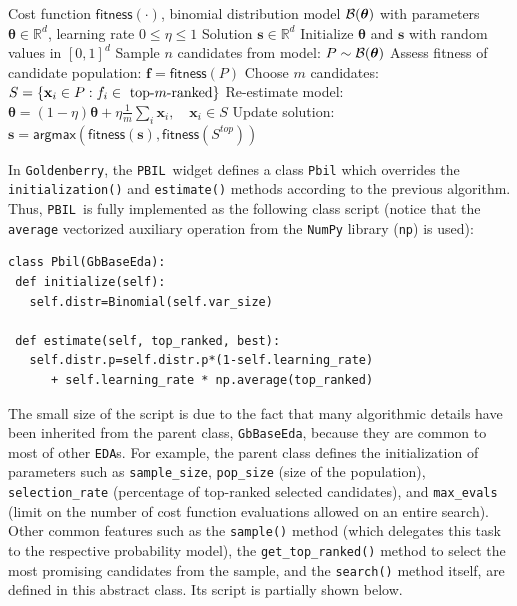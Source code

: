 \documentclass{sig-alternate}
\newcommand{\GB}{\texttt{Goldenberry}}
\newcommand{\PBIL}{\texttt{PBIL}}
\newcommand{\EDA}{\texttt{EDA}}
\newcommand{\bs}{{\mathbf s}}
\newcommand{\bx}{{\mathbf x}}
\renewcommand{\bf}{{\mathbf f}}
\newcommand{\cB}{{\cal B}}
\newcommand{\Rdom}{\mbox{$\mathbb{R}$}}
\begin{document}
\begin{algorithm}[H]
	\caption{\PBIL} 
	\small
	\begin{algorithmic}
	\REQUIRE Cost function $\mathsf{fitness}(\cdot)$, binomial distribution model $\cB(\boldsymbol \theta)$ with parameters $\boldsymbol \theta\in \Rdom^d$, learning rate $0 \le \eta \le 1$
	\ENSURE Solution $\bs \in \Rdom^d$
		\STATE Initialize $\boldsymbol \theta$ and $\bs$ with random values in $[0,1]^d$
		\WHILE{}
			\STATE Sample $n$ candidates from model: $P \sim \cB(\boldsymbol \theta)$ 
			\STATE Assess fitness of candidate population: $\bf = \mathsf{fitness}(P)$
			\STATE Choose $m$ candidates: $S = \{\bx_i \in P : f_i \in \textnormal{ top-$m$-ranked}\}$
			\STATE Re-estimate model: $\boldsymbol \theta = (1-\eta)\boldsymbol \theta + \eta\tfrac{1}{m}\sum_i{\bx_i}, \quad\bx_i \in S$
			\STATE Update solution: $\bs\!=\!\mathsf{argmax}(\mathsf{fitness}(\bs),\mathsf{fitness}(S^{top}))$
		\ENDWHILE
	\end{algorithmic}  
	\label{alg:PBIL}
\end{algorithm}

In \GB, the \PBIL~widget defines a class \texttt{Pbil} which overrides the \texttt{initialization()} and \texttt{estimate()} methods according to the previous algorithm. Thus, \PBIL~is fully implemented as the following class script (notice that the \texttt{average} vectorized auxiliary operation from the   \texttt{NumPy} library (\texttt{np}) is used):

\begin{verbatim}
class Pbil(GbBaseEda):
 def initialize(self):
   self.distr=Binomial(self.var_size)    

 def estimate(self, top_ranked, best):
   self.distr.p=self.distr.p*(1-self.learning_rate)
      + self.learning_rate * np.average(top_ranked)
\end{verbatim}

The small size of the script is due to the fact that many algorithmic details have been inherited from the parent class, \texttt{GbBaseEda}, because they are common to most of other \EDA s. For example, the parent class defines the initialization of parameters such as \texttt{sample\_size}, \texttt{pop\_size} (size of the population), \texttt{selection\_rate} (percentage of top-ranked selected candidates), and \texttt{max\_evals} (limit on the number of cost function evaluations allowed on an entire search). Other common features such as the \texttt{sample()} method (which delegates this task to the respective probability model), the \texttt{get\_top\_ranked()} method to select the most promising candidates from the sample, and the \texttt{search()} method itself, are defined in this abstract class. Its script is partially shown below.
\end{document}

